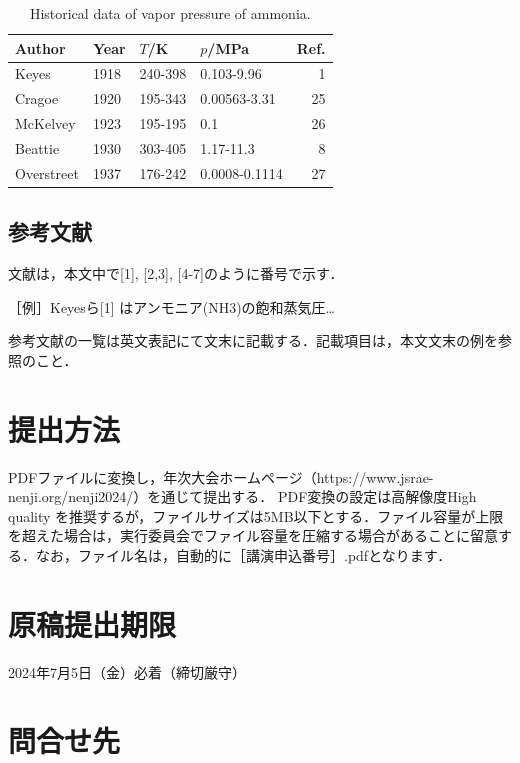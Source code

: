 \documentclass[A4,10pt,fleqn,dvipdfmx]{jarticle}
\begin{document}
\begin{table}[htbp]
  \begin{center}
  \caption{Historical data of vapor pressure of ammonia.}
  \begin{tabular}{llllr}
    \hline
    Author	& Year	& $T$/K	& $p$/MPa	& Ref. \\
    \hline
    Keyes	& 1918	& 240-398	& 0.103-9.96	& 1 \\
    Cragoe	& 1920	& 195-343	& 0.00563-3.31	& 25 \\
    McKelvey	& 1923	& 195-195	& 0.1	& 26 \\
    Beattie	& 1930	& 303-405	& 1.17-11.3	& 8 \\
    Overstreet	& 1937	& 176-242	& 0.0008-0.1114	& 27 \\
    \hline
  \end{tabular}
  \end{center}
\end{table}

\vspace{-30pt} %
\subsection{参考文献}
文献は，本文中で[1], [2,3], [4-7]のように番号で示す．

［例］Keyesら[1] はアンモニア(NH3)の飽和蒸気圧…

参考文献の一覧は英文表記にて文末に記載する．記載項目は，本文文末の例を参照のこと．

\section{提出方法}
PDFファイルに変換し，年次大会ホームページ（https://www.jsrae-nenji.org/nenji2024/）を通じて提出する． PDF変換の設定は高解像度High quality を推奨するが，ファイルサイズは5MB以下とする．ファイル容量が上限を超えた場合は，実行委員会でファイル容量を圧縮する場合があることに留意する．なお，ファイル名は，自動的に［講演申込番号］.pdfとなります．

\section{原稿提出期限}
2024年7月5日（金）必着（締切厳守）

\section{問合せ先}
\end{document}
